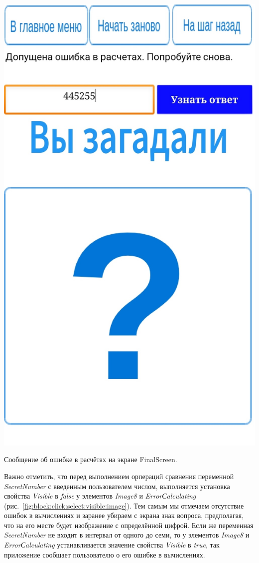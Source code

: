 \begin{marginfigure}[-2em]
\includegraphics{./graphics/programs/guess_numbers/finalScreen_Error_TheGuessingNumbersGame_AppInventor.jpg}
\caption[Сообщение об ошибке в расчётах на экране FinalScreen.]{Сообщение об ошибке в расчётах на экране FinalScreen.}
  \label{fig:block:final:screen:error:label}
\end{marginfigure}
Важно отметить, что перед выполнением орпераций сравнения переменной \textit{SecretNumber} с введенным пользователем числом, выполняется установка свойства \textit{Visible} в \textit{false} у элементов \textit{Image8} и \textit{ErrorСalculating} (рис.~\ref{fig:block:click:select:visible:image}).
Тем самым мы отмечаем отсутствие ошибок в вычислениях и заранее убираем с экрана знак вопроса, предполагая, что на его месте будет изображение с определённой цифрой. Если же переменная \textit{SecretNumber} не входит в интервал от одного до семи, то у элементов \textit{Image8} и \textit{ErrorСalculating} устанавливается значение свойства \textit{Visible} в \textit{true}, 
так приложение сообщает пользователю о его ошибке в вычислениях.

